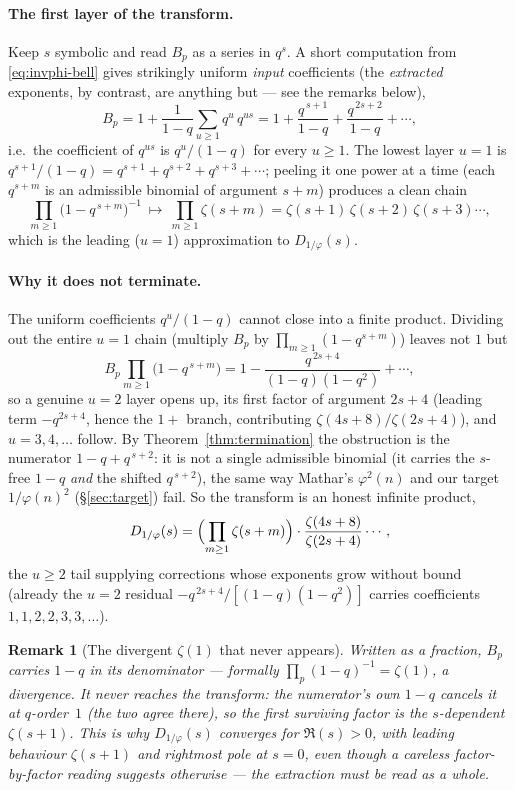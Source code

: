 \documentclass[11pt]{article}
\newtheorem{remark}[theorem]{Remark}
\begin{document}
\paragraph{The first layer of the transform.} Keep $s$ symbolic and read $B_p$ as a
series in $q^{s}$. A short computation from \eqref{eq:invphi-bell} gives strikingly
uniform \emph{input} coefficients (the \emph{extracted} exponents, by contrast, are
anything but --- see the remarks below),
\[
B_p=1+\frac{1}{1-q}\sum_{u\ge1}q^{u}\,q^{us}
   =1+\frac{q^{\,s+1}}{1-q}+\frac{q^{\,2s+2}}{1-q}+\cdots,
\]
i.e.\ the coefficient of $q^{us}$ is $q^{u}/(1-q)$ for every $u\ge1$. The lowest layer
$u=1$ is $q^{s+1}/(1-q)=q^{s+1}+q^{s+2}+q^{s+3}+\cdots$; peeling it one power at a time
(each $q^{s+m}$ is an admissible binomial of argument $s+m$) produces a clean chain
\[
\prod_{m\ge1}\bigl(1-q^{\,s+m}\bigr)^{-1}\ \longmapsto\
\prod_{m\ge1}\zeta(s+m)=\zeta(s+1)\,\zeta(s+2)\,\zeta(s+3)\cdots,
\]
which is the leading ($u=1$) approximation to $D_{1/\varphi}(s)$.

\paragraph{Why it does not terminate.} The uniform coefficients $q^{u}/(1-q)$ cannot
close into a finite product. Dividing out the entire $u=1$ chain (multiply $B_p$ by
$\prod_{m\ge1}(1-q^{s+m})$) leaves not $1$ but
\[
B_p\prod_{m\ge1}\bigl(1-q^{\,s+m}\bigr)
   =1-\frac{q^{\,2s+4}}{(1-q)(1-q^{2})}+\cdots,
\]
so a genuine $u=2$ layer opens up, its first factor of argument $2s+4$ (leading term
$-q^{2s+4}$, hence the $1+$ branch, contributing $\zeta(4s+8)/\zeta(2s+4)$), and
$u=3,4,\dots$ follow. By Theorem~\ref{thm:termination} the obstruction is the
numerator $1-q+q^{\,s+2}$: it is not a single admissible binomial (it carries the
$s$-free $1-q$ \emph{and} the shifted $q^{\,s+2}$), the same way Mathar's $\varphi^2(n)$
and our target $1/\varphi(n)^2$ (\S\ref{sec:target}) fail. So the transform is an
honest infinite product,
\[
D_{1/\varphi}(s)=\Bigl(\prod_{m\ge1}\zeta(s+m)\Bigr)\cdot\frac{\zeta(4s+8)}{\zeta(2s+4)}\cdots,
\]
the $u\ge2$ tail supplying corrections whose exponents grow without bound (already the
$u=2$ residual $-q^{\,2s+4}/[(1-q)(1-q^2)]$ carries coefficients $1,1,2,2,3,3,\dots$).

\begin{remark}[The divergent $\zeta(1)$ that never appears]
Written as a fraction, $B_p$ carries $1-q$ in its denominator --- formally
$\prod_p(1-q)^{-1}=\zeta(1)$, a divergence. It never reaches the transform: the
numerator's own $1-q$ cancels it at $q$-order~$1$ (the two agree there), so the first
surviving factor is the $s$-dependent $\zeta(s+1)$. This is why $D_{1/\varphi}(s)$
converges for $\Re(s)>0$, with leading behaviour $\zeta(s+1)$ and rightmost pole at
$s=0$, even though a careless factor-by-factor reading suggests otherwise --- the
extraction must be read as a whole.
\end{remark}
\end{document}
